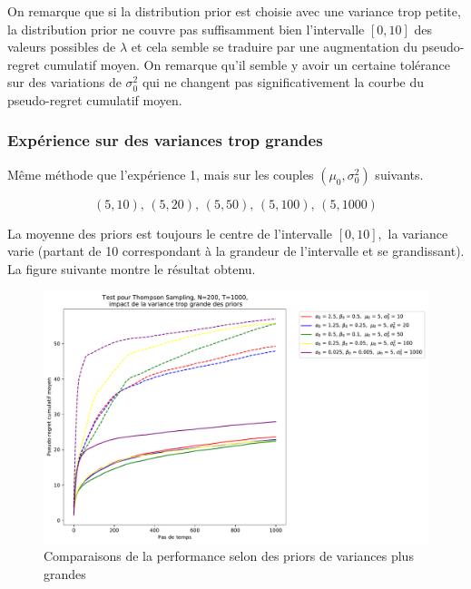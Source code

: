 \documentclass[letterpaper,11pt]{article}
\begin{document}
On remarque que si la distribution prior est choisie avec une variance trop petite, la distribution prior ne couvre pas suffisamment bien l'intervalle $[0,10]$ des valeurs possibles de $\lambda$ et cela semble se traduire par une augmentation du pseudo-regret cumulatif moyen. On remarque qu'il semble y avoir un certaine tolérance sur des variations de $\sigma^2_0$ qui ne changent pas significativement la courbe du pseudo-regret cumulatif moyen. 

\subsubsection*{Expérience sur des variances trop grandes}

Même méthode que l'expérience 1, mais sur les couples $(\mu_0,\sigma^2_0)$ suivants.

$$(5,10),\,(5,20),\,(5,50),\,(5,100),\,(5,1000)$$

La moyenne des priors est toujours le centre de l'intervalle $[0,10],$ la variance varie (partant de 10 correspondant à la grandeur de l'intervalle et se grandissant).\\

La figure suivante montre le résultat obtenu.

\begin{figure}[H]
\label{figure: variance petite}
\caption{Comparaisons de la performance selon des priors de variances plus grandes}
\begin{center}
\includegraphics[scale=0.5]{variance_trop_grande_N=200.pdf}
\end{center}
\end{figure}
\end{document}
